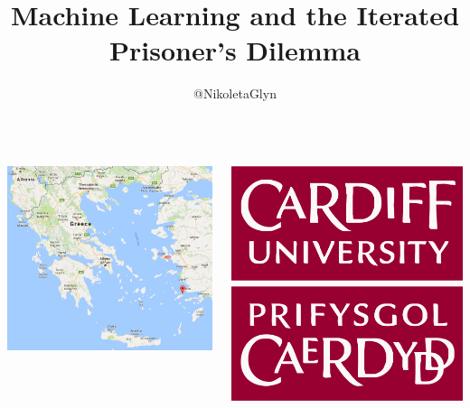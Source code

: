 \documentclass{beamer}
\title{Machine Learning and the Iterated Prisoner's Dilemma}
\author{@NikoletaGlyn}
\date{}
\institute[]
{
}
\begin{document}
\maketitle  

\begin{frame}
    \begin{columns}[T] %
    \begin{column}{.515\textwidth}
         \includegraphics[width=\textwidth]{static/kos.png}
    \end{column}%
    \begin{column}{.23\textwidth}
        \includegraphics[width=\textwidth]{static/cardiff_uni_logo.jpg}


\end{column}
\end{columns}
\end{frame}
\end{document}
